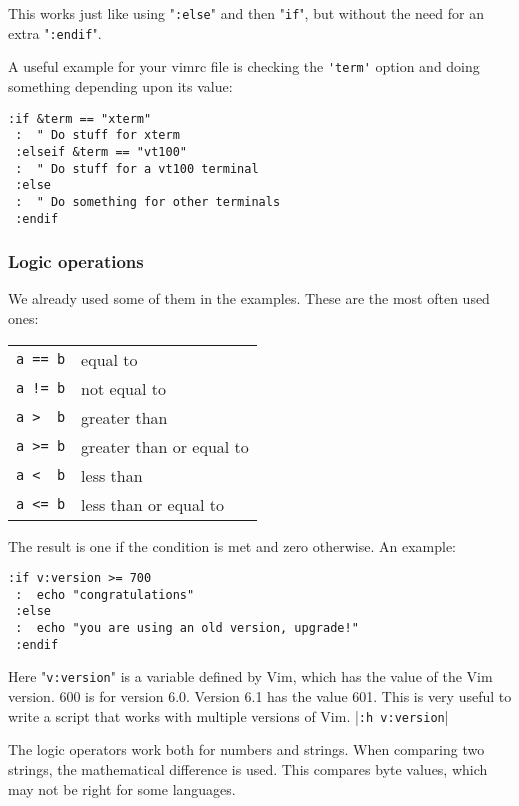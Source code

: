 This works just like using "\verb!:else!" and then "\verb!if!", but without the need for an extra "\verb!:endif!".

A useful example for your vimrc file is checking the \verb!'term'! option and doing something depending upon its value:

\begin{Verbatim}[samepage=true]
 :if &term == "xterm"
 :  " Do stuff for xterm
 :elseif &term == "vt100"
 :  " Do stuff for a vt100 terminal
 :else
 :  " Do something for other terminals
 :endif
\end{Verbatim}

\subsubsection{Logic operations}
We already used some of them in the examples.
These are the most often used ones:

\begin{center} \begin{tabular}{c l}
				\verb;a == b; & equal to \\
				\verb;a != b; & not equal to \\
				\verb;a >  b; & greater than \\
				\verb;a >= b; & greater than or equal to \\
				\verb;a <  b; & less than \\
				\verb;a <= b; & less than or equal to \\
\end{tabular} \end{center}

The result is one if the condition is met and zero otherwise.  An example:

\begin{Verbatim}[samepage=true]
 :if v:version >= 700
 :  echo "congratulations"
 :else
 :  echo "you are using an old version, upgrade!"
 :endif
\end{Verbatim}

Here "\verb!v:version!" is a variable defined by Vim, which has the value of the Vim version.
600 is for version 6.0.
Version 6.1 has the value 601.
This is very useful to write a script that works with multiple versions of Vim.
|\verb!:h v:version!|

The logic operators work both for numbers and strings.
When comparing two strings, the mathematical difference is used.
This compares byte values, which may not be right for some languages.

